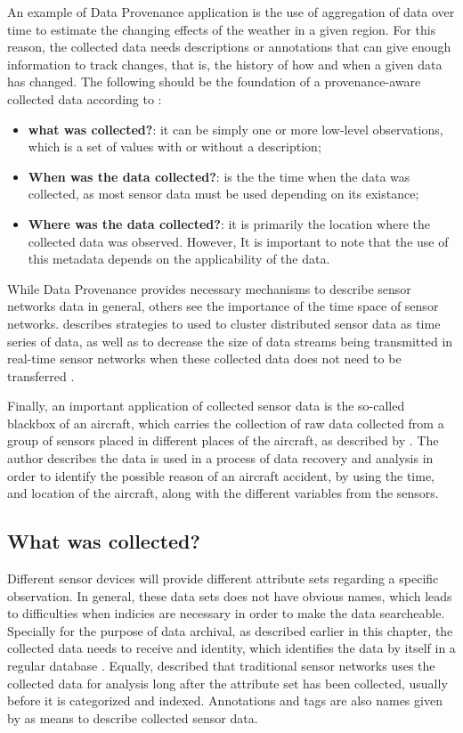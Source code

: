 An example of Data Provenance application is the use of aggregation of data
over time to estimate the changing effects of the weather in a given region.
For this reason, the collected data needs descriptions or annotations that can
give enough information to track changes, that is, the history of how and when
a given data has changed. The following should be the foundation of a
provenance-aware collected data according to \cite{sn-provenance}:

\begin{itemize}
  \item \textbf{what was collected?}: it can be simply one or more low-level
  observations, which is a set of values with or without a description;
  \item \textbf{When was the data collected?}: is the the time when the data was
  collected, as most sensor data must be used depending on its existance;
  \item \textbf{Where was the data collected?}: it is primarily the location
  where the collected data was observed. However, It is important to note that
  the use of this metadata depends on the applicability of the data.
\end{itemize}

While Data Provenance provides necessary mechanisms to describe sensor networks
data in general, others see the importance of the time space of sensor
networks. \cite{sn-time-series} describes strategies to used to cluster
distributed sensor data as time series of data, as well as to decrease the size
of data streams being transmitted in real-time sensor networks when these
collected data does not need to be transferred \cite{sn-data-reduction}.

Finally, an important application of collected sensor data is the so-called
blackbox of an aircraft, which carries the collection of raw data collected
from a group of sensors placed in different places of the aircraft, as
described by \cite{sn-exemple-blackbox}. The author describes the data is
used in a process of data recovery and analysis in order to identify the
possible reason of an aircraft accident, by using the time, and location of
the aircraft, along with the different variables from the sensors.

\subsection{What was collected?}

Different sensor devices will provide different attribute sets regarding a
specific observation. In general, these data sets does not have obvious names,
which leads to difficulties when indicies are necessary in order to make the
data searcheable. Specially for the purpose of data archival, as described
earlier in this chapter, the collected data needs to receive and identity,
which identifies the data by itself in a regular database
\cite{relational-model}. Equally, \cite{sn-provenance} described that
traditional sensor networks uses the collected data for analysis long after
the attribute set has been collected, usually before it is categorized and
indexed. Annotations and tags are also names given by \cite{sn-provenance} as
means to describe collected sensor data.

